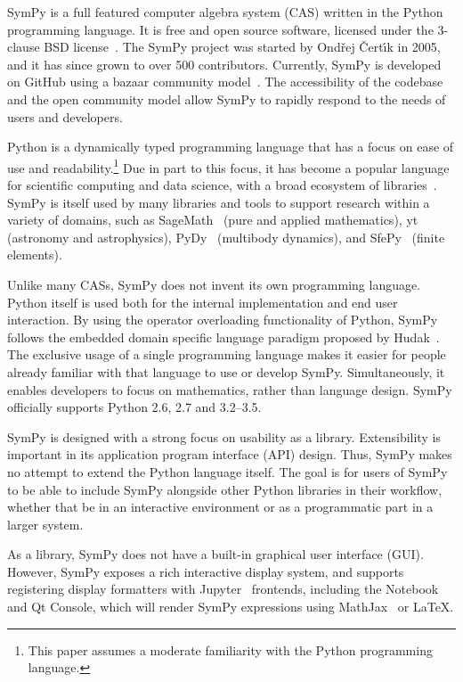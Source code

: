 SymPy is a full featured computer algebra system (CAS) written in the
Python~\cite{lutz2013learning}
programming language.
It is free and open source software, licensed under the 3-clause BSD
license~\cite{rosen2005open}.
The SymPy project was started by Ond\v{r}ej \v{C}ert\'{\i}k in 2005, and it has
since grown to over 500 contributors. Currently, SymPy is
developed on GitHub using a bazaar community
model~\cite{raymond1999cathedral}. The accessibility of the codebase and the
open community model allow SymPy to rapidly respond to the needs of
users and developers.

Python is a dynamically typed programming language that has a focus on
ease of use and readability.\footnote{This paper assumes a moderate
  familiarity with the Python programming language.} Due in part to this focus, it has become a popular
language for scientific
computing and data science, with a broad ecosystem of
libraries~\cite{oliphant2007python}. SymPy is itself used by many libraries
and tools to support research within a variety of domains, such as
SageMath~\cite{sagemath} (pure and applied mathematics),
yt~\cite{2011ApJS..192....9T} (astronomy and astrophysics),
PyDy~\cite{gede2013constrained} (multibody dynamics), and
SfePy~\cite{cimrman2014sfepy} (finite elements).

Unlike many CASs, SymPy does not invent its own programming language. Python
itself is used both for the internal implementation and end user
interaction. By using the operator overloading functionality of Python, SymPy follows the embedded domain specific language paradigm proposed by Hudak~\cite{dsl-little-languages}.  The exclusive usage of a single programming language makes it easier
for people already familiar with that language to use or develop SymPy.
Simultaneously, it enables developers to focus on mathematics, rather than
language design.  SymPy officially supports Python 2.6, 2.7 and 3.2--3.5.

SymPy is designed with a strong focus on usability as a library.
Extensibility is important in its application program interface
(API) design. Thus, SymPy makes no attempt to extend
the Python language itself. The goal is for users of SymPy to be able to
include SymPy alongside other Python libraries in their workflow, whether that
be in an interactive environment or as a programmatic part in a larger system.

As a library, SymPy does not have a built-in graphical user interface (GUI).
However, SymPy exposes a rich interactive display system, and supports
registering display formatters with Jupyter~\cite{kluyver2016jupyter} frontends,
including the Notebook and Qt Console, which will render SymPy expressions
using MathJax~\cite{cervone2012mathjax} or \LaTeX{}.

